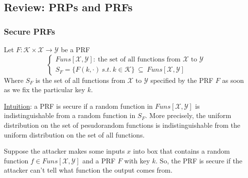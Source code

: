 \documentclass[12pt]{book}
\begin{document}
\subsection{Review: PRPs and PRFs}
\subsubsection{Secure PRFs}
Let $F:\mathcal{K}\times\mathcal{X}\rightarrow\mathcal{Y}$ be a PRF
$$\left\{\begin{array}{l}
	Funs[\mathcal{X},\mathcal{Y}]:\ \text{the set of all functions from }\mathcal{X}\text{ to }\mathcal{Y}\\[0.5cm]
	S_{F}=\{F(k,\cdot)\ s.t.\ k\in\mathcal{K}\}\ \subseteq\ Funs[\mathcal{X},\mathcal{Y}]
\end{array}\right.$$
Where $S_{F}$ is the set of all functions from $\mathcal{X}$ to $\mathcal{Y}$ specified by the PRF $F$ as soon as we fix the particular key $k$.

\underline{Intuition}: a PRF is secure if a random function in $Funs[\mathcal{X},\mathcal{Y}]$ is indistinguishable from a random function in $S_{F}$. More precisely, the uniform distribution on the set of pesudorandom functions is indistinguishable from the uniform distribution on the set of all functions.
\begin{center}
\end{center}

Suppose the attacker makes some inputs $x$ into box that contains a random function $f\in Funs[\mathcal{X},\mathcal{Y}]$ and a PRF $F$ with key $k$. So, the PRF is secure if the attacker can't tell what function the output comes from.
\end{document}

